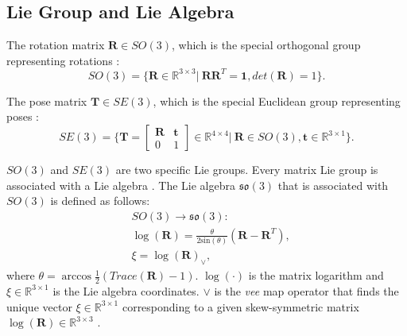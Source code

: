 \subsection{Lie Group and Lie Algebra} \label{lie}
The rotation matrix $\mathbf{R}\in SO(3)$, which is the special orthogonal group representing rotations \cite{barfoot}:
\begin{equation}
SO(3) = \{ \mathbf{R}\in\mathbb{R}^{3\times3} | \ \mathbf{R}\mathbf{R}^{T}=\mathbf{1},det(\mathbf{R}) =1 \}.
\end{equation} \par
The pose matrix $\mathbf{T} \in SE(3)$, which is the special Euclidean group representing poses \cite{barfoot}:
\begin{equation}
SE(3) = \{ \mathbf{T} = \left[\begin{array}{cc}
\mathbf{R} & \mathbf{t} \\
0 & 1 
\end{array}\right] \in \mathbb{R}^{4 \times 4} | \ \mathbf{R} \in SO(3), \mathbf{t}\in \mathbb{R}^{3 \times 1}\}.
\end{equation} \par
$SO(3)$ and $SE(3)$ are two specific Lie groups. Every matrix Lie group is associated with a Lie algebra \cite{barfoot}. The Lie algebra $\mathfrak{so(\mathrm{3})}$ that is associated with $SO(3)$ is defined as follows:
\begin{equation}
\begin{aligned}
& SO(3) \rightarrow \mathfrak{so(\mathrm{3})}: \\
& \log(\mathbf{R}) = \frac{\theta}{2\mathrm{sin}(\theta)}(\mathbf{R}-\mathbf{R}^{T}),  \\ 
& \xi = \log(\mathbf{R})_{\vee}, 
\end{aligned}
\end{equation}
where $\theta= \arccos \frac{1}{2}(Trace(\mathbf{R})-1)$. $\log(\cdot)$ is the matrix logarithm and $\xi \in \mathbb{R}^{3\times1}$ is the Lie algebra coordinates. $\vee$ is the \textit{vee} map operator that finds the unique vector $\xi \in \mathbb{R}^{3\times1}$ corresponding to a given skew-symmetric matrix $\log(\mathbf{R})\in \mathbb{R}^{3 \times 3}$ \cite{barfoot,tagslam}.

